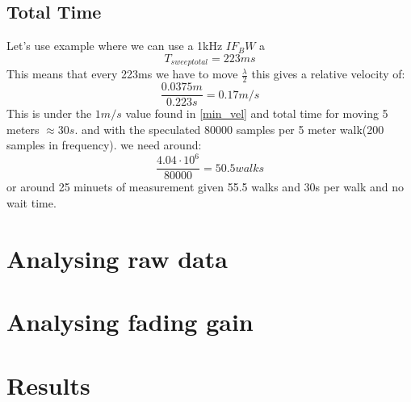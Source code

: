 \subsection{Total Time}
Let's use example where we can use a 1kHz $IF_BW$ a
\begin{equation}
T_{sweep total} = 223ms
\end{equation}
This means that every 223ms we have to move $\frac{\lambda}{2}$ this gives a relative velocity of:
\begin{equation}
\frac{0.0375m}{0.223s} = 0.17 m/s
\end{equation}
This is under the $1m/s$ value found in \autoref{min_vel}
and total time for moving 5 meters $\approx 30s$.
and with the speculated 80000 samples per 5 meter walk(200 samples in frequency). we need around:
\begin{equation}
\frac{4.04 \cdot 10^6}{80000} = 50.5 walks
\end{equation}
or around 25 minuets of measurement given 55.5 walks and 30s per walk and no wait time.
\section{Analysing raw data}


\section{Analysing fading gain}


\section{Results}